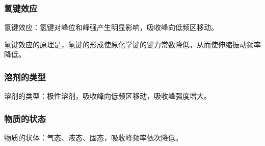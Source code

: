 \subsubsection{氢键效应}
氢键效应：氢键对峰位和峰强产生明显影响，吸收峰向低频区移动。

氢键效应的原理是，氢键的形成使原化学键的键力常数降低，从而使伸缩振动频率降低。

\subsubsection{溶剂的类型}
溶剂的类型：极性溶剂，吸收峰向低频区移动，吸收峰强度增大。

\subsubsection{物质的状态}
物质的状体：气态、液态、固态，吸收峰频率依次降低。